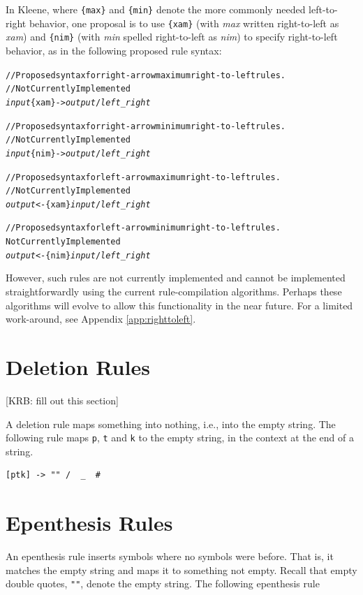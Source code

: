 In Kleene, where \texttt{\{max\}} and \texttt{\{min\}} denote the more
commonly needed left-to-right behavior, one proposal is to use
\texttt{\{xam\}} (with \emph{max} written right-to-left as \emph{xam}) and \texttt{\{nim\}}
(with \emph{min} spelled right-to-left as \emph{nim}) to specify right-to-left
behavior, as in the following proposed rule syntax:

\begin{alltt}
// Proposed syntax for right-arrow maximum right-to-left rules. 
// Not Currently Implemented
\emph{input} \{xam\}-> \emph{output} / \emph{left} _ \emph{right}

// Proposed syntax for right-arrow minimum right-to-left rules.
// Not Currently Implemented
\emph{input} \{nim\}-> \emph{output} / \emph{left} _ \emph{right}

// Proposed syntax for left-arrow maximum right-to-left rules. 
// Not Currently Implemented
\emph{output} <-\{xam\} \emph{input} / \emph{left} _ \emph{right}

// Proposed syntax for left-arrow minimum right-to-left rules.
Not Currently Implemented
\emph{output} <-\{nim\} \emph{input} / \emph{left} _ \emph{right}
\end{alltt}

\noindent
However, such rules are not currently implemented and cannot be implemented
straightforwardly using the current rule-compilation algorithms.  Perhaps these
algorithms will evolve to allow this functionality in the near future.  For a
limited work-around, see Appendix \ref{app:righttoleft}.


\section{Deletion Rules}

[KRB:  fill out this section]

A deletion rule maps something into nothing, i.e., into the empty string.  The
following rule maps \texttt{p}, \texttt{t} and \texttt{k} to the empty string, in
the context at the end of a string.


\begin{Verbatim}
[ptk] -> "" /  _  #
\end{Verbatim}


\section{Epenthesis Rules}

An epenthesis rule inserts symbols where no symbols were before.  That is, it matches the empty string and maps it to
something not empty.  Recall that empty double quotes, \verb!""!, denote the empty string.  The following epenthesis rule

